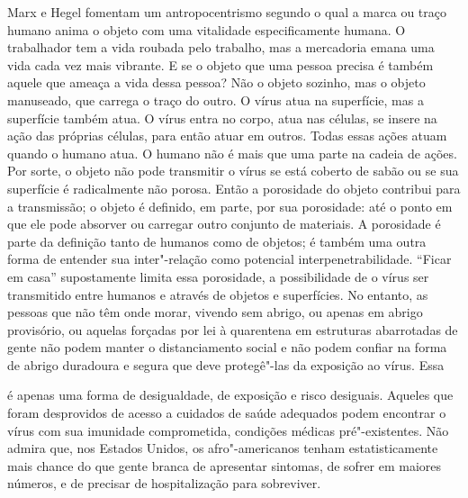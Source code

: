 \begin{multicols}{2}
Marx e Hegel fomentam um antropocentrismo segundo o qual a marca ou
traço humano anima o objeto com uma vitalidade especificamente humana. O
trabalhador tem a vida roubada pelo trabalho, mas a mercadoria emana uma
vida cada vez mais vibrante. E se o objeto que uma pessoa precisa é
também aquele que ameaça a vida dessa pessoa? Não o objeto sozinho, mas
o objeto manuseado, que carrega o traço do outro. O vírus atua na
superfície, mas a superfície também atua. O vírus entra no corpo, atua
nas células, se insere na ação das próprias células, para então atuar em
outros. Todas essas ações atuam quando o humano atua. O humano não é
mais que uma parte na cadeia de ações. Por sorte, o objeto não pode
transmitir o vírus se está coberto de sabão ou se sua superfície é
radicalmente não porosa. Então a porosidade do objeto contribui para a
transmissão; o objeto é definido, em parte, por sua porosidade: até o
ponto em que ele pode absorver ou carregar outro conjunto de materiais.
A porosidade é parte da definição tanto de humanos como de objetos; é
também uma outra forma de entender sua inter"-relação como potencial
interpenetrabilidade. ``Ficar em casa'' supostamente limita essa
porosidade, a possibilidade de o vírus ser transmitido entre humanos e
através de objetos e superfícies. No entanto, as pessoas que não têm
onde morar, vivendo sem abrigo, ou apenas em abrigo provisório, ou
aquelas forçadas por lei à quarentena em estruturas abarrotadas de gente
não podem manter o distanciamento social e não podem confiar na forma de
abrigo duradoura e segura que deve protegê"-las da exposição ao vírus.
Essa

\bigskip

{}

\bigskip

\noindent{}é apenas uma forma de desigualdade, de exposição e risco desiguais.
Aqueles que foram desprovidos de acesso a cuidados de saúde adequados
podem encontrar o vírus com sua imunidade comprometida, condições
médicas pré"-existentes. Não admira que, nos Estados Unidos, os
afro"-americanos tenham estatisticamente mais chance do que gente branca
de apresentar sintomas, de sofrer em maiores números, e de precisar de
hospitalização para sobreviver.



\end{multicols}
